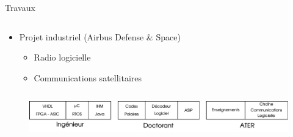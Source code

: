\documentclass[t,compress,mathserif,12pt,xcolor=dvipsnames]{beamer}
\begin{document}
\begin{frame}[t]{Travaux}
 \begin{minipage}[t][5.0cm][t]{\textwidth}
    \begin{columns}[T]
      \begin{column}{0.63\textwidth}
          \begin{itemize}
            \item Projet industriel (Airbus Defense \& Space)
            \begin{itemize}
              \item Radio logicielle
              \item Communications satellitaires
            \end{itemize}
          \end{itemize}
      \end{column}
      \begin{column}{0.04\textwidth}

      \end{column}
      \begin{column}{0.33\textwidth}
      \end{column}
    \end{columns}
  \end{minipage}
  \begin{figure}[htp]
    \centering
    \includegraphics[width=\textwidth]{fig/frise9}
  \end{figure}
\end{frame}
\end{document}
